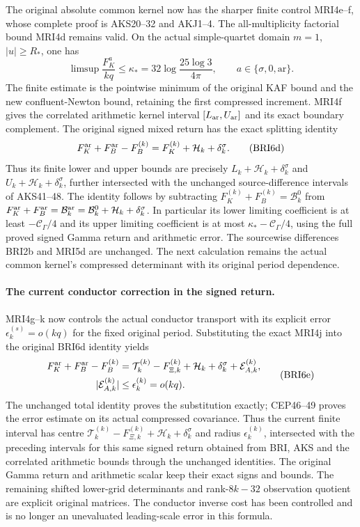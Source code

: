 \documentclass[11pt,a4paper]{article}
\begin{document}
The original absolute common kernel now has the sharper finite
control MRI4e--f, whose complete proof is AKS20--32 and AKJ1--4.
The all-multiplicity factorial bound MRI4d remains valid. On the
actual simple-quartet domain $m=1$, $|u|\ge R_*$, one has
\[
 \limsup\frac{F_K^a}{kq}
 \le\kappa_*=32\log\frac{25\log3}{4\pi},\qquad
 a\in\{\sigma,0,\mathrm{ar}\}.
 \tag{BRI6c}
\]
The finite estimate is the pointwise minimum of the original KAF
bound and the new confluent-Newton bound, retaining the first
compressed increment. MRI4f gives the correlated arithmetic kernel
interval $[L_{\rm ar},U_{\rm ar}]$ and its exact boundary complement.
The original signed mixed return has the exact splitting identity
\[
 F_K^{\rm ar}+F_B^{\rm ar}-F_B^{(k)}
   =F_K^{(k)}+\mathcal H_k+\delta_k^\sigma.
 \tag{BRI6d}
\]
Thus its finite lower and upper bounds are precisely
$L_k+\mathcal H_k+\delta_k^\sigma$ and
$U_k+\mathcal H_k+\delta_k^\sigma$, further intersected with the
unchanged source-difference intervals of AKS41--48. The identity
follows by subtracting
$F_K^{(k)}+F_B^{(k)}=\mathcal B_k^0$ from
$F_K^{\rm ar}+F_B^{\rm ar}=\mathcal B_k^{\rm ar}
 =\mathcal B_k^0+\mathcal H_k+\delta_k^\sigma$.
In particular its lower limiting coefficient is at least
$-\mathcal C_\Gamma/4$ and its upper limiting coefficient is at
most $\kappa_*-\mathcal C_\Gamma/4$, using the full proved signed
Gamma return and arithmetic error. The sourcewise differences
BRI2b and MRI5d are unchanged. The next calculation remains the
actual common kernel's compressed determinant with its original
period dependence.


\paragraph{The current conductor correction in the signed return.}
MRI4g--k now controls the actual conductor transport with its explicit
error $\epsilon_k^{(s)}=o(kq)$ for the fixed original period.
Substituting the exact MRI4j into the original BRI6d identity yields
\[
 \begin{split}
 F_K^{\rm ar}+F_B^{\rm ar}-F_B^{(k)}
 &=\mathcal T_k^{(k)}-F_{\Xi,k}^{(k)}
       +\mathcal H_k+\delta_k^\sigma+\mathcal E_{A,k}^{(k)},\\
 |\mathcal E_{A,k}^{(k)}|&\le\epsilon_k^{(k)}=o(kq).
 \end{split}\tag{BRI6e}
\]
The unchanged total identity proves the substitution exactly;
CEP46--49 proves the error estimate on its actual compressed
covariance. Thus the current finite interval has centre
$\mathcal T_k^{(k)}-F_{\Xi,k}^{(k)}+\mathcal H_k+\delta_k^\sigma$
and radius $\epsilon_k^{(k)}$, intersected with the preceding
intervals for this same signed return obtained from BRI, AKS and
the correlated arithmetic bounds through the unchanged identities.
The original Gamma return
and arithmetic scalar keep their exact signs and bounds.
The remaining shifted lower-grid determinants and rank-$8k-32$
observation quotient are explicit original matrices. The conductor
inverse cost has been controlled and is no longer an unevaluated
leading-scale error in this formula.
\end{document}
